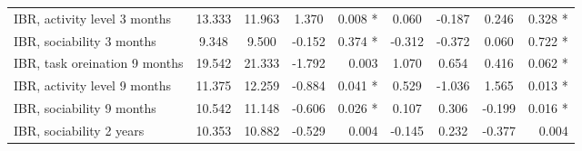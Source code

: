 \begin{tabular}{l c c c r c c c r}
IBR, activity level 3 months & 13.333 & 11.963 & 1.370 & 0.008 * & 0.060 & -0.187 & 0.246 & 0.328 * \\
IBR, sociability 3 months & 9.348 & 9.500 & -0.152 & 0.374 * & -0.312 & -0.372 & 0.060 & 0.722 * \\
IBR, task oreination 9 months & 19.542 & 21.333 & -1.792 & 0.003 & 1.070 & 0.654 & 0.416 & 0.062 * \\
IBR, activity level 9 months & 11.375 & 12.259 & -0.884 & 0.041 * & 0.529 & -1.036 & 1.565 & 0.013 * \\
IBR, sociability 9 months & 10.542 & 11.148 & -0.606 & 0.026 * & 0.107 & 0.306 & -0.199 & 0.016 * \\
IBR, sociability 2 years & 10.353 & 10.882 & -0.529 & 0.004 & -0.145 & 0.232 & -0.377 & 0.004 \\
\bottomrule
\end{tabular}
